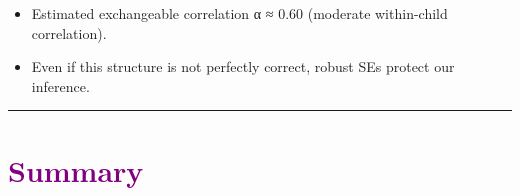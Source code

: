 \documentclass[
  letterpaper,
  DIV=11,
  numbers=noendperiod]{scrreprt}
\providecommand{\tightlist}{%
  \setlength{\itemsep}{0pt}\setlength{\parskip}{0pt}}\usepackage{longtable,booktabs,array}
\begin{document}
\begin{itemize}
  \begin{itemize}
  \tightlist
  \item
    Estimated exchangeable correlation α ≈ 0.60 (moderate within-child
    correlation).\\
  \item
    Even if this structure is not perfectly correct, robust SEs protect
    our inference.
  \end{itemize}
\end{itemize}

\begin{center}\rule{0.5\linewidth}{0.5pt}\end{center}

\hypertarget{section-16}{%
\section*{\texorpdfstring{\textcolor{purple}{Summary}}{}}\label{section-16}}

\markright{\textcolor{purple}{Summary}}
\end{document}
